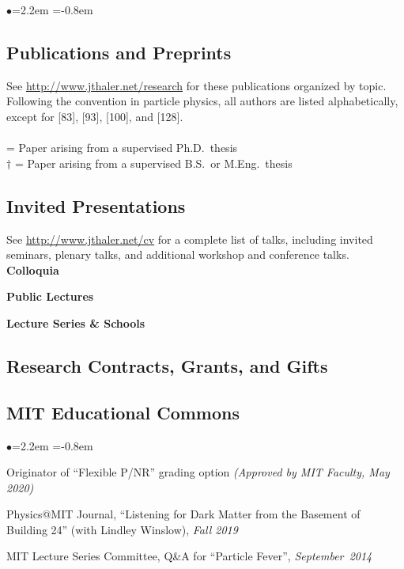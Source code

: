 \documentclass[11pt]{article}
\newcommand{\heading}[1]{\vspace{0in}\subsection*{#1} \vspace{.02in}}
\newcommand{\bbl}{\begin{list}{$\bullet$}{\leftmargin=2.2em \itemsep=-1pt \itemindent=-0.8em}}
\newcommand{\el}{\end{list}}
\begin{document}
\bbl

\el



\heading{Publications and Preprints}

See \url{http://www.jthaler.net/research} for these publications organized by topic.  Following the convention in particle physics, all authors are listed alphabetically, except for [83], [93], [100], and [128]. \\
~\\
\noindent * = Paper arising from a supervised Ph.D.\ thesis\\
\noindent $\dagger$ = Paper arising from a supervised B.S.\ or M.Eng.\ thesis\\

\vspace{-.1in}
 



\heading{Invited Presentations}

See \url{http://www.jthaler.net/cv} for a complete list of talks, including invited seminars, plenary talks, and additional workshop and conference talks.\\

\noindent \textbf{Colloquia}




\noindent \textbf{Public Lectures}




\noindent \textbf{Lecture Series \& Schools}



  
\heading{Research Contracts, Grants, and Gifts}




\heading{MIT Educational Commons}

\bbl
\item Originator of ``Flexible P/NR'' grading option \textit{(Approved by MIT Faculty, May 2020)}

\item Physics@MIT Journal, ``Listening for Dark Matter from the Basement of Building 24'' (with Lindley Winslow), \textit{Fall 2019}
\item MIT Lecture Series Committee, Q\&A for ``Particle Fever'', \textit{September~2014}
\el
\end{document}
